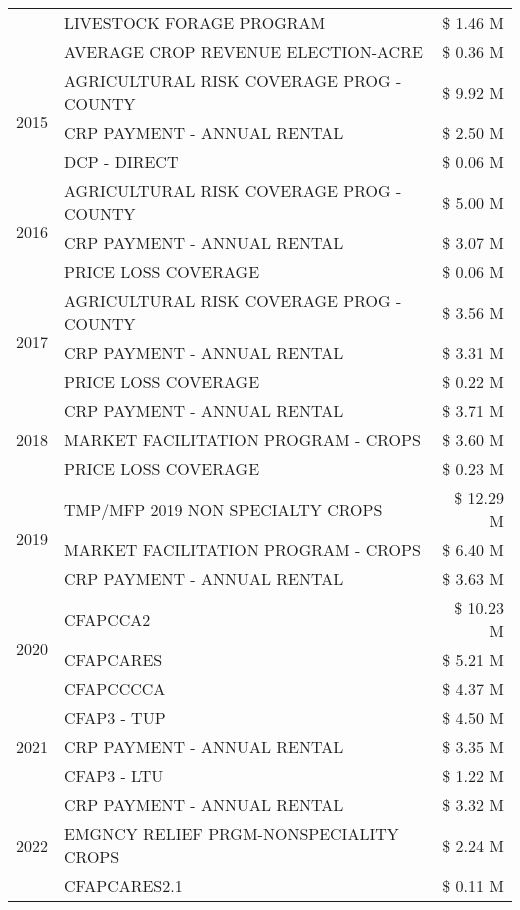 \begin{tabular}{llr}
 & LIVESTOCK FORAGE PROGRAM & \$ 1.46 M \\
 & AVERAGE CROP REVENUE ELECTION-ACRE & \$ 0.36 M \\
\cline{1-3}
\multirow[t]{3}{*}{2015} & AGRICULTURAL RISK COVERAGE PROG - COUNTY & \$ 9.92 M \\
 & CRP PAYMENT - ANNUAL RENTAL & \$ 2.50 M \\
 & DCP - DIRECT & \$ 0.06 M \\
\cline{1-3}
\multirow[t]{3}{*}{2016} & AGRICULTURAL RISK COVERAGE PROG - COUNTY & \$ 5.00 M \\
 & CRP PAYMENT - ANNUAL RENTAL & \$ 3.07 M \\
 & PRICE LOSS COVERAGE & \$ 0.06 M \\
\cline{1-3}
\multirow[t]{3}{*}{2017} & AGRICULTURAL RISK COVERAGE PROG - COUNTY & \$ 3.56 M \\
 & CRP PAYMENT - ANNUAL RENTAL & \$ 3.31 M \\
 & PRICE LOSS COVERAGE & \$ 0.22 M \\
\cline{1-3}
\multirow[t]{3}{*}{2018} & CRP PAYMENT - ANNUAL RENTAL & \$ 3.71 M \\
 & MARKET FACILITATION PROGRAM - CROPS & \$ 3.60 M \\
 & PRICE LOSS COVERAGE & \$ 0.23 M \\
\cline{1-3}
\multirow[t]{3}{*}{2019} & TMP/MFP 2019 NON SPECIALTY CROPS & \$ 12.29 M \\
 & MARKET FACILITATION PROGRAM - CROPS & \$ 6.40 M \\
 & CRP PAYMENT - ANNUAL RENTAL & \$ 3.63 M \\
\cline{1-3}
\multirow[t]{3}{*}{2020} & CFAPCCA2 & \$ 10.23 M \\
 & CFAPCARES & \$ 5.21 M \\
 & CFAPCCCCA & \$ 4.37 M \\
\cline{1-3}
\multirow[t]{3}{*}{2021} & CFAP3 - TUP & \$ 4.50 M \\
 & CRP PAYMENT - ANNUAL RENTAL & \$ 3.35 M \\
 & CFAP3 - LTU & \$ 1.22 M \\
\cline{1-3}
\multirow[t]{3}{*}{2022} & CRP PAYMENT - ANNUAL RENTAL & \$ 3.32 M \\
 & EMGNCY RELIEF PRGM-NONSPECIALITY CROPS & \$ 2.24 M \\
 & CFAPCARES2.1 & \$ 0.11 M \\
\cline{1-3}
\bottomrule
\end{tabular}
